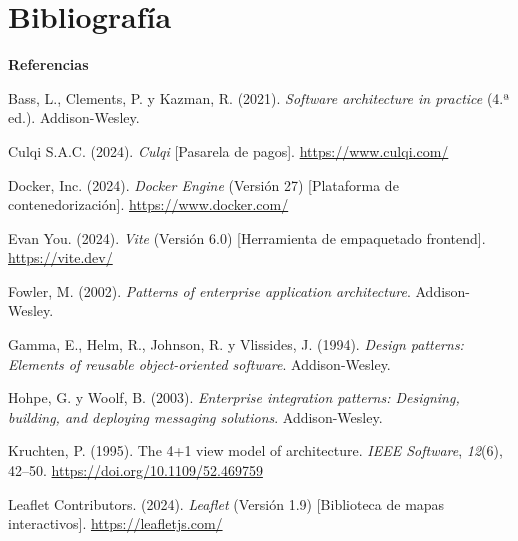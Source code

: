 
\section{Bibliografía}

\begin{center}
\textbf{Referencias}
\end{center}

\begin{list}{}{\setlength{\leftmargin}{1.27cm}\setlength{\itemindent}{-1.27cm}\setlength{\parsep}{0pt}\setlength{\itemsep}{0pt}}

\item Bass, L., Clements, P. y Kazman, R. (2021). \textit{Software architecture in practice} (4.ª ed.). Addison-Wesley.

\item Culqi S.A.C. (2024). \textit{Culqi} [Pasarela de pagos]. \url{https://www.culqi.com/}

\item Docker, Inc. (2024). \textit{Docker Engine} (Versión 27) [Plataforma de contenedorización]. \url{https://www.docker.com/}

\item Evan You. (2024). \textit{Vite} (Versión 6.0) [Herramienta de empaquetado frontend]. \url{https://vite.dev/}

\item Fowler, M. (2002). \textit{Patterns of enterprise application architecture}. Addison-Wesley.

\item Gamma, E., Helm, R., Johnson, R. y Vlissides, J. (1994). \textit{Design patterns: Elements of reusable object-oriented software}. Addison-Wesley.

\item Hohpe, G. y Woolf, B. (2003). \textit{Enterprise integration patterns: Designing, building, and deploying messaging solutions}. Addison-Wesley.

\item Kruchten, P. (1995). The 4+1 view model of architecture. \textit{IEEE Software}, \textit{12}(6), 42--50. \url{https://doi.org/10.1109/52.469759}

\item Leaflet Contributors. (2024). \textit{Leaflet} (Versión 1.9) [Biblioteca de mapas interactivos]. \url{https://leafletjs.com/}


\end{list}
